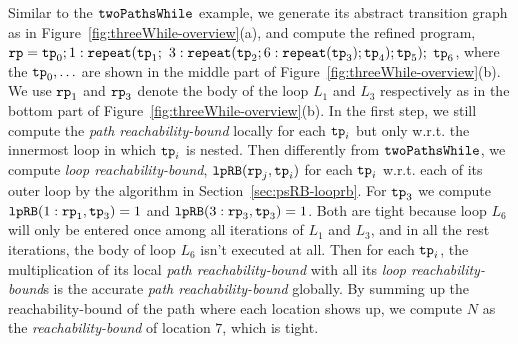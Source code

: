 Similar to the $\mathtt{twoPathsWhile}$ example, we generate its abstract transition graph as in Figure~\ref{fig:threeWhile-overview}(a),
and compute the refined program,
$\mathtt{rp} = \mathtt{tp}_0; 1: \mathtt{repeat}(\mathtt{tp}_1;$ 
$3: {\mathtt{repeat}(\mathtt{tp}_2; 6 : {\mathtt{repeat}(\mathtt{tp}_3)}; \mathtt{tp}_4)}; \mathtt{tp}_5);$ 
$\mathtt{tp}_6$,
where the $\mathtt{tp}_0, \ldots$ are shown in the middle part of Figure~\ref{fig:threeWhile-overview}(b).
We use $\mathtt{rp}_1$ and $\mathtt{rp}_3$ denote the body of the loop $L_1$ and $L_3$ respectively as in the bottom part of Figure~\ref{fig:threeWhile-overview}(b).
In the first step, we still compute the \emph{path reachability-bound} locally for each $\mathtt{tp}_i$ but only w.r.t. the innermost loop in which $\mathtt{tp}_i$ is nested.
Then differently from $\mathtt{twoPathsWhile}$,
we compute \emph{loop reachability-bound}, $\mathtt{lpRB}(\mathtt{rp}_j, \mathtt{tp}_i)$ for each $\mathtt{tp}_i$ w.r.t. each of its outer loop by the algorithm in Section~\ref{sec:psRB-looprb}.
For $\mathtt{tp}_3$ we compute
$\mathtt{lpRB}(1: \mathtt{rp}_1, \mathtt{tp}_3) = 1$ and
$\mathtt{lpRB}(3: \mathtt{rp}_3, \mathtt{tp}_3) = 1$.
Both are tight because loop $L_6$ will only be entered once among all iterations of $L_1$ and $L_3$, and in all the rest iterations, the body of loop $L_6$ isn't executed at all.
Then for each $\mathtt{tp}_i$, the multiplication of its local \emph{path reachability-bound} with all its \emph{loop reachability-bound}s is the accurate \emph{path reachability-bound} globally.
By summing up the reachability-bound of the path where each location shows up,
we compute $N$ as the \emph{reachability-bound} of location $7$, which is tight.
